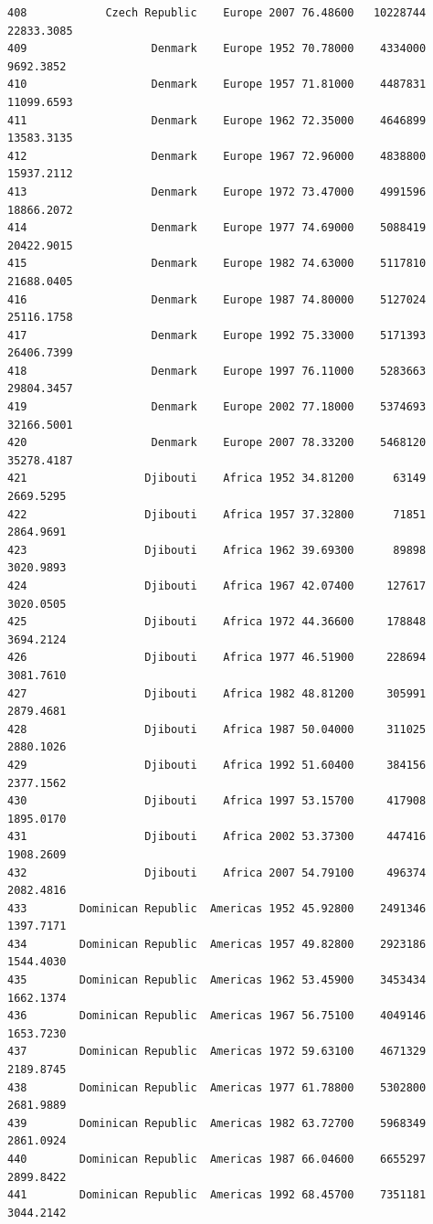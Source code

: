 \documentclass[
  letterpaper,
  DIV=11,
  numbers=noendperiod]{scrreprt}
\begin{document}
\begin{verbatim}
408            Czech Republic    Europe 2007 76.48600   10228744  22833.3085
409                   Denmark    Europe 1952 70.78000    4334000   9692.3852
410                   Denmark    Europe 1957 71.81000    4487831  11099.6593
411                   Denmark    Europe 1962 72.35000    4646899  13583.3135
412                   Denmark    Europe 1967 72.96000    4838800  15937.2112
413                   Denmark    Europe 1972 73.47000    4991596  18866.2072
414                   Denmark    Europe 1977 74.69000    5088419  20422.9015
415                   Denmark    Europe 1982 74.63000    5117810  21688.0405
416                   Denmark    Europe 1987 74.80000    5127024  25116.1758
417                   Denmark    Europe 1992 75.33000    5171393  26406.7399
418                   Denmark    Europe 1997 76.11000    5283663  29804.3457
419                   Denmark    Europe 2002 77.18000    5374693  32166.5001
420                   Denmark    Europe 2007 78.33200    5468120  35278.4187
421                  Djibouti    Africa 1952 34.81200      63149   2669.5295
422                  Djibouti    Africa 1957 37.32800      71851   2864.9691
423                  Djibouti    Africa 1962 39.69300      89898   3020.9893
424                  Djibouti    Africa 1967 42.07400     127617   3020.0505
425                  Djibouti    Africa 1972 44.36600     178848   3694.2124
426                  Djibouti    Africa 1977 46.51900     228694   3081.7610
427                  Djibouti    Africa 1982 48.81200     305991   2879.4681
428                  Djibouti    Africa 1987 50.04000     311025   2880.1026
429                  Djibouti    Africa 1992 51.60400     384156   2377.1562
430                  Djibouti    Africa 1997 53.15700     417908   1895.0170
431                  Djibouti    Africa 2002 53.37300     447416   1908.2609
432                  Djibouti    Africa 2007 54.79100     496374   2082.4816
433        Dominican Republic  Americas 1952 45.92800    2491346   1397.7171
434        Dominican Republic  Americas 1957 49.82800    2923186   1544.4030
435        Dominican Republic  Americas 1962 53.45900    3453434   1662.1374
436        Dominican Republic  Americas 1967 56.75100    4049146   1653.7230
437        Dominican Republic  Americas 1972 59.63100    4671329   2189.8745
438        Dominican Republic  Americas 1977 61.78800    5302800   2681.9889
439        Dominican Republic  Americas 1982 63.72700    5968349   2861.0924
440        Dominican Republic  Americas 1987 66.04600    6655297   2899.8422
441        Dominican Republic  Americas 1992 68.45700    7351181   3044.2142

\end{verbatim}
\end{document}
